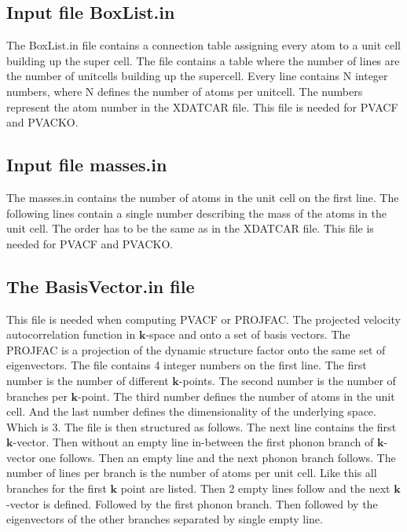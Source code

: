\documentclass[a4paper,12pt]{article}
\begin{document}
\subsection{Input file BoxList.in}\label{BoxFile}
The BoxList.in file contains a connection table assigning every atom
to a unit cell building up the super cell.
The file contains a table where the number of lines are the number of unitcells
building up the supercell. Every line contains N integer numbers, where N defines
the number of atoms per unitcell. The numbers represent the atom number in the 
XDATCAR file. This file is needed for PVACF and PVACKO.




\subsection{Input file \textbf{masses.in}}\label{MassFile}
The masses.in contains the number of atoms in the unit cell on the first line.
The following lines contain a single number describing the mass of the atoms in the unit cell.
The order has to be the same as in the XDATCAR file.
This file is needed for PVACF and PVACKO.




\subsection{The \textbf{BasisVector.in} file}
This file is needed when computing PVACF or PROJFAC. The projected velocity autocorrelation
function in $\mathbf{k}$-space and onto a set of basis vectors. The PROJFAC
is a projection of the dynamic structure factor onto the same set of eigenvectors.
The file contains 4 integer numbers on the first line. The first number is the 
number of different $\mathbf{k}$-points. The second number is the number of branches per
$\mathbf{k}$-point. The third number defines the number of atoms in the unit cell. And the
last number defines the dimensionality of the underlying space. Which is 3.
The file is then structured as follows. The next line contains the first $\mathbf{k}$-vector.
Then without an empty line in-between the first phonon branch of $\mathbf{k}$-vector one follows.
Then an empty line and the next phonon branch follows. The number of lines per
branch is the number of atoms per unit cell.
Like this all branches for the first $\mathbf{k}$ point are listed. Then 2 empty lines
follow and the next $\mathbf{k}$-vector is defined. Followed by the first phonon branch.
Then followed by the eigenvectors of the other branches separated by single empty line.
\end{document}
